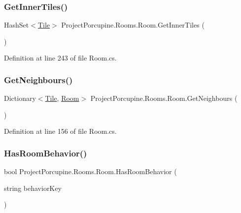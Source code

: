 \subsubsection{\texorpdfstring{Get\+Inner\+Tiles()}{GetInnerTiles()}}
{\footnotesize\ttfamily Hash\+Set$<$\hyperlink{class_tile}{Tile}$>$ Project\+Porcupine.\+Rooms.\+Room.\+Get\+Inner\+Tiles (\begin{DoxyParamCaption}{ }\end{DoxyParamCaption})}



Definition at line 243 of file Room.\+cs.

\mbox{\label{class_project_porcupine_1_1_rooms_1_1_room_a1caf1f4b954b00e4eb9360350e0c834b}} 
\subsubsection{\texorpdfstring{Get\+Neighbours()}{GetNeighbours()}}
{\footnotesize\ttfamily Dictionary$<$\hyperlink{class_tile}{Tile}, \hyperlink{class_project_porcupine_1_1_rooms_1_1_room}{Room}$>$ Project\+Porcupine.\+Rooms.\+Room.\+Get\+Neighbours (\begin{DoxyParamCaption}{ }\end{DoxyParamCaption})}



Definition at line 156 of file Room.\+cs.

\mbox{\label{class_project_porcupine_1_1_rooms_1_1_room_ae02dffee7fa78343b51c865aa4822139}} 
\subsubsection{\texorpdfstring{Has\+Room\+Behavior()}{HasRoomBehavior()}}
{\footnotesize\ttfamily bool Project\+Porcupine.\+Rooms.\+Room.\+Has\+Room\+Behavior (\begin{DoxyParamCaption}\item[{string}]{behavior\+Key }\end{DoxyParamCaption})}



